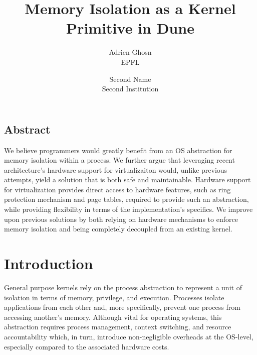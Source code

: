 \documentclass[letterpaper,twocolumn,10pt]{article}
\begin{document}
\date{}

\title{\Large \bf Memory Isolation as a Kernel Primitive in Dune}

\author{
{\rm Adrien Ghosn}\\
EPFL
\and
{\rm Second Name}\\
Second Institution
} %

\maketitle

\thispagestyle{empty}


\subsection*{Abstract}

We believe programmers would greatly benefit from an OS abstraction for memory isolation within a process.
We further argue that leveraging recent architecture's hardware support for virtualizaiton would, unlike previous attempts, yield a solution that is both safe and maintainable.
Hardware support for virtualization provides direct access to hardware features, such as ring protection mechanism and page tables, required to provide such an abstraction, while providing flexibility in terms of the implementation's specifics.
We improve upon previous solutions by both relying on hardware mechanisms to enforce memory isolation and being completely decoupled from an existing kernel.

\section{Introduction}

General purpose kernels rely on the process abstraction to represent a unit of isolation in terms of memory, privilege, and execution.
Processes isolate applications from each other and, more specifically, prevent one process from accessing another's memory.
Although vital for operating systems, this abstraction requires process management, context switching, and resource accountability which, in turn, introduce non-negligible overheads at the OS-level, especially compared to the associated hardware costs. \\
\end{document}
